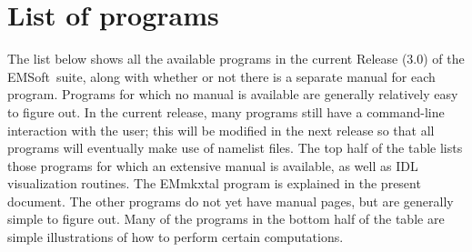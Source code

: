 \documentclass[DIV=calc, paper=letter, fontsize=11pt]{scrartcl}	 %
\newcommand{\ctp}{\textsf{EMSoft}}
\begin{document}
%
%
%
%

\section{List of programs\label{sec:executables}}
The list below shows all the available programs in the current Release (3.0) of the \ctp\ suite, along with whether or not there is a 
separate manual for each program.  Programs for which no manual is available are generally relatively easy to figure out.
In the current release, many programs still have a command-line interaction with the user; this will be modified
in the next release so that all programs will eventually make use of namelist files.  The top half of the table
lists those programs for which an extensive manual is available, as well as IDL visualization routines. The \textsf{EMmkxtal}
program is explained in the present document.  The other programs do not yet have manual pages, but are generally 
simple to figure out.  Many of the programs in the bottom half of the table are simple illustrations of how 
to perform certain computations.

\end{document}
